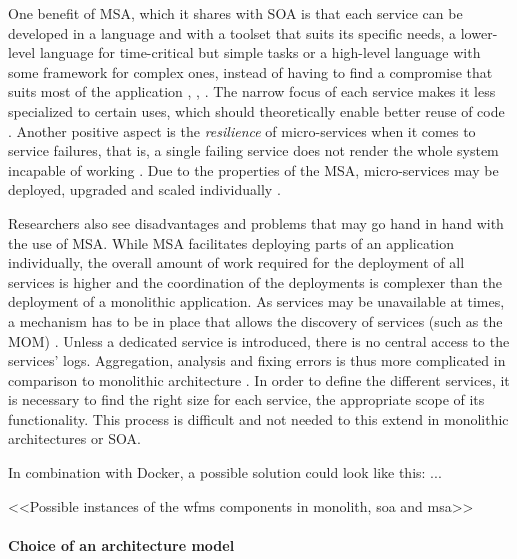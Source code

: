     One benefit of \ac{MSA}, which it shares with \ac{SOA} is that each service can be developed in a language and with a toolset that suits its specific needs, \eg a lower-level language for time-critical but simple tasks or a high-level language with some framework for complex ones, instead of having to find a compromise that suits most of the application  \cite[p.~35]{Stubbs2015Distributed}, \cite[p.~4]{Newman2015Building}, \cite[p.~113]{Thones2015Microservices}.
    The narrow focus of each service makes it less specialized to certain uses, which should theoretically enable better reuse of code \cite[p.~35]{Stubbs2015Distributed}.
    Another positive aspect is the \emph{resilience} of micro-services when it comes to service failures, that is, a single failing service does not render the whole system incapable of working \cite[p.~5]{Newman2015Building}.
    Due to the properties of the \ac{MSA}, micro-services may be deployed, upgraded and scaled individually \cite[p.~116]{Thones2015Microservices}.

    Researchers also see disadvantages and problems that may go hand in hand with the use of \ac{MSA}.
    While \ac{MSA} facilitates deploying parts of an application individually, the overall amount of work required for the deployment of all services is higher and the coordination of the deployments is complexer than the deployment of a monolithic application.
    As services may be unavailable at times, a mechanism has to be in place that allows the discovery of services (such as the \ac{MOM}) \cite[p.~35]{Stubbs2015Distributed}.
    Unless a dedicated service is introduced, there is no central access to the services' logs. Aggregation, analysis and fixing errors is thus more complicated in comparison to monolithic architecture \cite[p.~35]{Stubbs2015Distributed}.
    In order to define the different services, it is necessary to find the right size for each service, \ie the appropriate scope of its functionality. This process is difficult and not needed to this extend in monolithic architectures or \ac{SOA}.

    In combination with Docker, a possible solution could look like this: ...

  <<Possible instances of the wfms components in monolith, soa and msa>>

  \paragraph{Choice of an architecture model} %
    \label{par:choice_of_an_achitecture_model}

